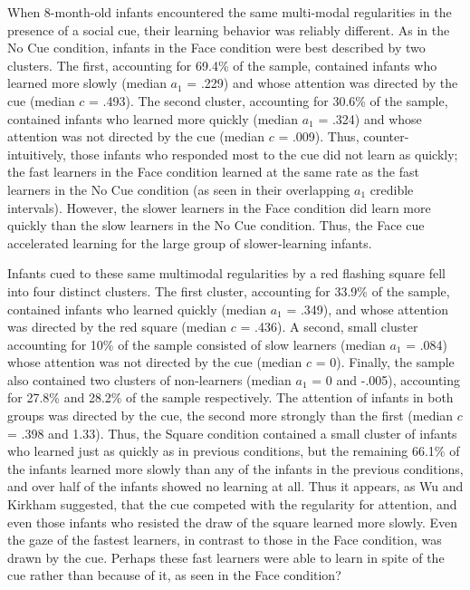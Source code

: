 \documentclass[12pt]{article}
\begin{document}
	When 8-month-old infants encountered the same multi-modal regularities in the presence of a social cue, their learning behavior was reliably different. As in the No Cue condition, infants in the Face condition were best described by two clusters. The first, accounting for 69.4\% of the sample, contained infants who learned more slowly (median $a_{1}$ = .229) and whose attention was directed by the cue (median $c$ = .493). The second cluster, accounting for 30.6\% of the sample, contained infants who learned more quickly (median $a_{1}$ = .324) and whose attention was not directed by the cue (median $c$ = .009). Thus, counter-intuitively, those infants who responded most to the cue did not learn as quickly; the fast learners in the Face condition learned at the same rate as the fast learners in the No Cue condition (as seen in their overlapping $a_{1}$ credible intervals). However, the slower learners in the Face condition did learn more quickly than the slow learners in the No Cue condition. Thus, the Face cue accelerated learning for the large group of slower-learning infants.

	Infants cued to these same multimodal regularities by a red flashing square fell into four distinct clusters. The first cluster, accounting for 33.9\% of the sample, contained infants who learned quickly (median $a_{1}$ = .349), and whose attention was directed by the red square (median $c$ = .436). A second, small cluster accounting for 10\% of the sample consisted of slow learners (median $a_{1}$ = .084) whose attention was not directed by the cue (median $c$ = 0). Finally, the sample also contained two clusters of non-learners (median $a_{1}$ = 0 and -.005), accounting for 27.8\% and 28.2\% of the sample respectively. The attention of infants in both groups was directed by the cue, the second more strongly than the first (median $c$ = .398 and 1.33). Thus, the Square condition contained a small cluster of infants who learned just as quickly as in previous conditions, but the remaining 66.1\% of the infants learned more slowly than any of the infants in the previous conditions, and over half of the infants showed no learning at all. Thus it appears, as Wu and Kirkham \cite{Wu2010a} suggested, that the cue competed with the regularity for attention, and even those infants who resisted the draw of the square learned more slowly. Even the gaze of the fastest learners, in contrast to those in the Face condition, was drawn by the cue. Perhaps these fast learners were able to learn in spite of the cue rather than because of it, as seen in the Face condition? 
\end{document}
